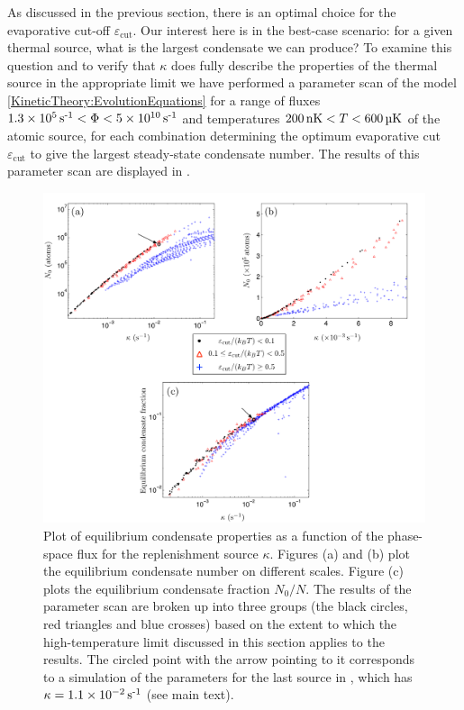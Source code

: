As discussed in the previous section, there is an optimal choice for the evaporative cut-off $\varepsilon_\text{cut}$. Our interest here is in the best-case scenario: for a given thermal source, what is the largest condensate we can produce? To examine this question and to verify that $\kappa$ does fully describe the properties of the thermal source in the appropriate limit we have performed a parameter scan of the model \eqref{KineticTheory:EvolutionEquations} for a range of fluxes $\unit[1.3\times 10^5]{s\textsuperscript{-1}} < \Phi < \unit[5\times 10^{10}]{s\textsuperscript{-1}}$ and temperatures $\unit[200]{nK} < T < \unit[600]{\micro K}$ of the atomic source, for each combination determining the optimum evaporative cut $\varepsilon_\text{cut}$ to give the largest steady-state condensate number.  The results of this parameter scan are displayed in .

\begin{figure}
    \centering
    \includegraphics[width=15cm]{FigureOfMerit}
    \caption{Plot of equilibrium condensate properties as a function of the phase-space flux for the replenishment source $\kappa$. Figures (a) and (b) plot the equilibrium condensate number on different scales. Figure (c) plots the equilibrium condensate fraction $N_0/N$.  The results of the parameter scan are broken up into three groups (the black circles, red triangles and blue crosses) based on the extent to which the high-temperature limit discussed in this section applies to the results. The circled point with the arrow pointing to it corresponds to a simulation of the parameters for the last source in , which has $\kappa= \unit[1.1\times 10^{-2}]{s\textsuperscript{-1}}$ (see main text).}
    \label{KineticTheory:FigureOfMerit}
\end{figure}

